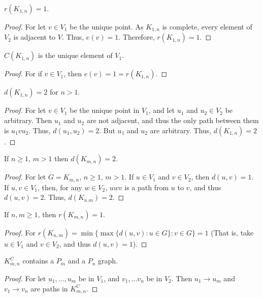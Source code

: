         \begin{corollary}
        $r(K_{1,n}) = 1$.
        \end{corollary}
        \begin{proof}
        For let $v\in V_1$ be the unique point. As $K_{1,n}$ is complete, every element of $V_2$ is adjacent to $V$. Thus, $e(v) = 1$. Therefore, $r(K_{1,n}) =1$.
        \end{proof}
        \begin{corollary}
        $C(K_{1,n})$ is the unique element of $V_1$.
        \end{corollary}
        \begin{proof}
        For if $v\in V_1$, then $e(v) = 1 = r(K_{1,n})$.
        \end{proof}
        \begin{corollary}
        $d(K_{1,n})=2$ for $n>1$.
        \end{corollary}
        \begin{proof}
        For let $v\in V_1$ be the unique point in $V_1$, and let $u_1$ and $u_2 \in V_2$ be arbitrary. Then $u_1$ and $u_2$ are not adjacent, and thus the only path between them is $u_1 v u_2$. Thus, $d(u_1,u_2) = 2$. But $u_1$ and $u_2$ are arbitrary. Thus, $d(K_{1,n}) = 2$.
        \end{proof}
        \begin{corollary}
        If $n\geq1$, $m> 1$ then $d(K_{m,n}) = 2$.
        \end{corollary}
        \begin{proof}
        For let $G=K_{m,n}$, $n\geq1$, $m> 1$. If $u\in V_1$ and $v\in V_2$, then $d(u,v) = 1$. If $u,v\in V_1$, then, for any $w\in V_2$, $uwv$ is a path from $u$ to $v$, and thus $d(u,v) = 2$. Thus, $d(K_{n.m}) = 2$.
        \end{proof}
        \begin{corollary}
        If $n,m\geq 1$, then $r(K_{m,n}) = 1$.
        \end{corollary}
        \begin{proof}
        For $r(K_{n,m}) = \min\{ \max\{d(u,v):u\in G\}: v\in G\} = 1$ (That is, take $u\in V_1$ and $v\in V_2$, and thus $d(u,v)=1$).
        \end{proof}
        \begin{corollary}
        $K_{m,n}^C$ contains a $P_m$ and a $P_n$ graph.
        \end{corollary}
        \begin{proof}
        For let $u_1,\hdots, u_m$ be in $V_1$, and $v_1,\hdots v_n$ be in $V_2$. Then $u_1 \rightarrow u_m$ and $v_1 \rightarrow v_n$ are paths in $K_{m,n}^C$.
        \end{proof}
